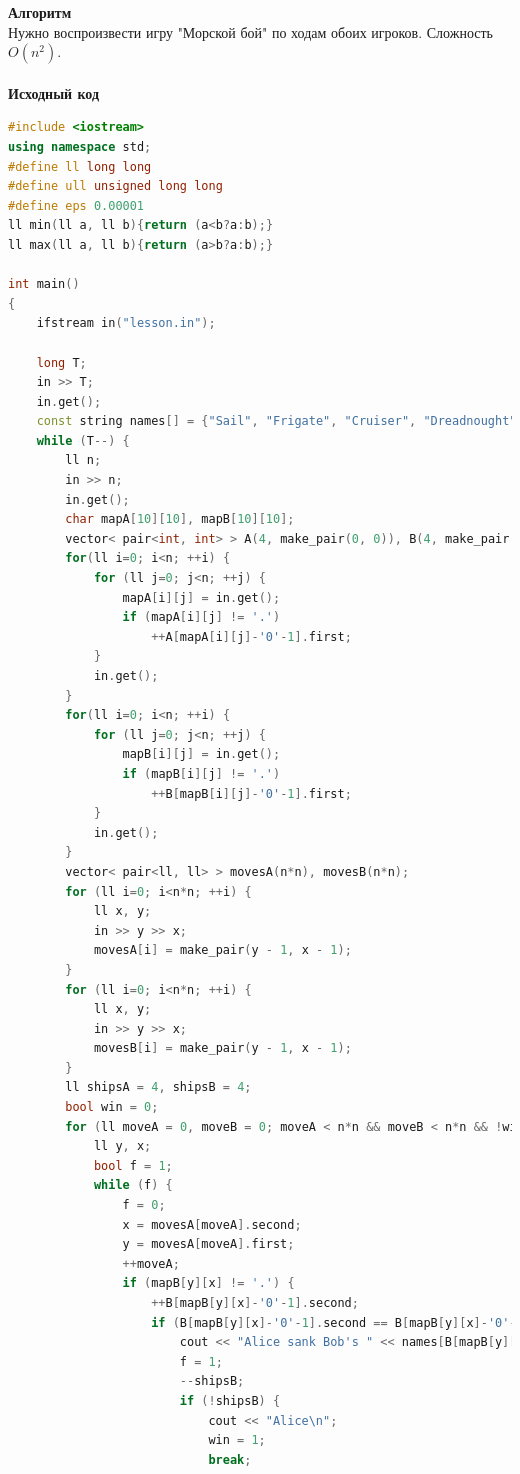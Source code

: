 \documentclass[a4paper,12pt]{article}
\begin{document}
\textbf{{\large Алгоритм}} \\
Нужно воспроизвести игру "Морской бой" по ходам обоих игроков. Сложность $O(n^2)$. \\ 
\\
\textbf{{\large Исходный код}}
\begin{lstlisting}[language=C++]
#include <iostream>
using namespace std;
#define ll long long
#define ull unsigned long long
#define eps 0.00001
ll min(ll a, ll b){return (a<b?a:b);}
ll max(ll a, ll b){return (a>b?a:b);}

int main()
{
    ifstream in("lesson.in");

    long T;
    in >> T;
    in.get();
    const string names[] = {"Sail", "Frigate", "Cruiser", "Dreadnought"};
    while (T--) {
        ll n;
        in >> n;
        in.get();
        char mapA[10][10], mapB[10][10];
        vector< pair<int, int> > A(4, make_pair(0, 0)), B(4, make_pair(0, 0));
        for(ll i=0; i<n; ++i) {
            for (ll j=0; j<n; ++j) {
                mapA[i][j] = in.get();
                if (mapA[i][j] != '.')
                    ++A[mapA[i][j]-'0'-1].first;
            }
            in.get();
        }
        for(ll i=0; i<n; ++i) {
            for (ll j=0; j<n; ++j) {
                mapB[i][j] = in.get();
                if (mapB[i][j] != '.')
                    ++B[mapB[i][j]-'0'-1].first;
            }
            in.get();
        }
        vector< pair<ll, ll> > movesA(n*n), movesB(n*n);
        for (ll i=0; i<n*n; ++i) {
            ll x, y;
            in >> y >> x;
            movesA[i] = make_pair(y - 1, x - 1);
        }
        for (ll i=0; i<n*n; ++i) {
            ll x, y;
            in >> y >> x;
            movesB[i] = make_pair(y - 1, x - 1);
        }
        ll shipsA = 4, shipsB = 4;
        bool win = 0;
        for (ll moveA = 0, moveB = 0; moveA < n*n && moveB < n*n && !win;) {
            ll y, x;
            bool f = 1;
            while (f) {
                f = 0;
                x = movesA[moveA].second;
                y = movesA[moveA].first;
                ++moveA;
                if (mapB[y][x] != '.') {
                    ++B[mapB[y][x]-'0'-1].second;
                    if (B[mapB[y][x]-'0'-1].second == B[mapB[y][x]-'0'-1].first) {
                        cout << "Alice sank Bob's " << names[B[mapB[y][x]-'0'-1].first-1] << '\n';
                        f = 1;
                        --shipsB;
                        if (!shipsB) {
                            cout << "Alice\n";
                            win = 1;
                            break;

\end{lstlisting}
\end{document}
